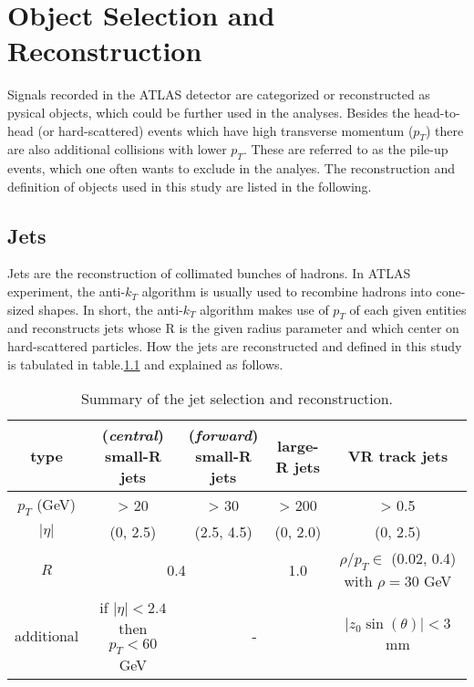 \documentclass[class=NCU_thesis, crop=false]{standalone}
\begin{document}
\chapter{Object Selection and Reconstruction}
	Signals recorded in the ATLAS detector are categorized or reconstructed as pysical objects, which could be further used in the analyses. Besides the head-to-head (or hard-scattered) events which have high transverse momentum ($p_T$) there are also additional collisions with lower $p_T$. These are referred to as the pile-up events, which one often wants to exclude in the analyes. The reconstruction and definition of objects used in this study are listed in the following.
	
\section{Jets}\label{jet}
	Jets are the reconstruction of collimated bunches of hadrons. In ATLAS experiment, the anti-$k_T$ algorithm \cite{0802.1189} is usually used to recombine hadrons into cone-sized shapes. In short, the anti-$k_T$ algorithm makes use of $p_T$ of each given entities and reconstructs jets whose R is the given radius parameter and which center on hard-scattered particles. How the jets are reconstructed and defined in this study is tabulated in table.\ref{tab:jet selection} and explained as follows.
	
	\begin{table}[h]
		\centering
		\caption{Summary of the jet selection and reconstruction.}
		\label{tab:jet selection}
		\begin{tabular}{|c|c|c|c|c|}
			\hline
			type & \shortstack{(\textit{central})\\small-R jets} & \shortstack{(\textit{forward})\\small-R jets} & large-R jets & VR track jets \\ \hline
			$p_T$ (GeV) & > 20 & > 30 & > 200 & > 0.5 \\ \hline
			$\lvert \eta \rvert$ & (0, 2.5) & (2.5, 4.5) & (0, 2.0) & (0, 2.5) \\ \hline
			$R$ & \multicolumn{2}{c|}{0.4} & 1.0 & \shortstack{$\rho / p_T \in$ (0.02, 0.4)\\ with $\rho = 30$ GeV} \\ \hline
			additional & \shortstack{if $\lvert \eta \rvert < 2.4$ then\\$p_T < 60$ GeV} & \multicolumn{2}{c|}{-} & $\lvert z_0 \sin(\theta) \rvert < 3$ mm \\ \hline
		\end{tabular}
	\end{table}
	
\end{document}
